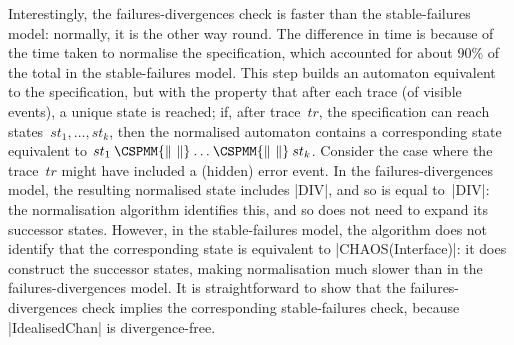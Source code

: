 Interestingly, the failures-divergences check is faster than the
stable-failures model: normally, it is the other way round.  The difference in
time is because of the time taken to normalise the specification, which
accounted for about 90\% of the total in the stable-failures model.  This step
builds an automaton equivalent to the specification, but with the property
that after each trace (of visible events), a unique state is reached; if,
after trace~$tr$, the specification can reach states~$st_1,\ldots,st_k$, then
the normalised automaton contains a corresponding state equivalent to $st_1
\mathbin{\CSPMM{\|~\|}} \ldots \mathbin{\CSPMM{\|~\|}} st_k$.  Consider the
case where the trace~$tr$ might have included a (hidden) error event.  In the
failures-divergences model, the resulting normalised state includes |DIV|, and
so is equal to~|DIV|: the normalisation algorithm identifies this, and so does
not need to expand its successor states.  However, in the stable-failures
model, the algorithm does not identify that the corresponding state is
equivalent to |CHAOS(Interface)|: it does construct the successor states,
making normalisation much slower than in the failures-divergences model.  It
is straightforward to show that the failures-divergences check implies the
corresponding stable-failures check, because |IdealisedChan| is
divergence-free.


